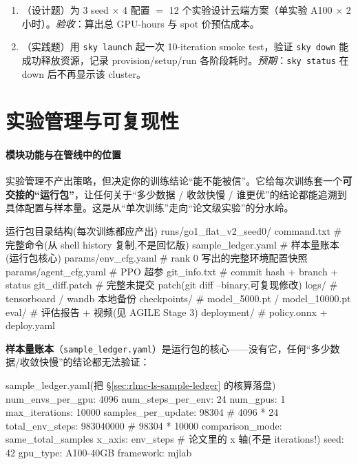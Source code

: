 \begin{practice}[云端训练练习]
\begin{enumerate}
\item （设计题）为 3 seed $\times$ 4 配置 $=$ 12 个实验设计云端方案（单实验 A100 $\times$ 2 小时）。\emph{验收}：算出总 GPU-hours 与 spot 价预估成本。
\item （实践题）用 \verb|sky launch| 起一次 10-iteration smoke test，验证 \verb|sky down| 能成功释放资源，记录 provision/setup/run 各阶段耗时。\emph{预期}：\verb|sky status| 在 down 后不再显示该 cluster。
\end{enumerate}
\end{practice}

\section{实验管理与可复现性}
\label{sec:rlmc-ls-repro}

\paragraph{\texorpdfstring{ 模块功能与在管线中的位置}{1 模块功能与在管线中的位置}}实验管理不产出策略，但决定你的训练结论“能不能被信”。它给每次训练套一个\textbf{可交接的“运行包”}，让任何关于“多少数据 / 收敛快慢 / 谁更优”的结论都能追溯到具体配置与样本量。这是从“单次训练”走向“论文级实验”的分水岭。

\begin{codebox}[text]{运行包目录结构(每次训练都应产出)}
runs/go1_flat_v2_seed0/
  command.txt           # 完整命令(从 shell history 复制,不是回忆版)
  sample_ledger.yaml    # 样本量账本(运行包核心)
  params/env_cfg.yaml   # rank 0 写出的完整环境配置快照
  params/agent_cfg.yaml # PPO 超参
  git_info.txt          # commit hash + branch + status
  git_diff.patch        # 完整未提交 patch(git diff --binary,可复现修改)
  logs/                 # tensorboard / wandb 本地备份
  checkpoints/          # model_5000.pt / model_10000.pt
  eval/                 # 评估报告 + 视频(见 AGILE Stage 3)
  deployment/           # policy.onnx + deploy.yaml
\end{codebox}

\textbf{样本量账本}（\verb|sample_ledger.yaml|）是运行包的核心——没有它，任何“多少数据/收敛快慢”的结论都无法验证：

\begin{codebox}[text]{sample\_ledger.yaml(把 §\ref{sec:rlmc-ls-sample-ledger} 的核算落盘)}
num_envs_per_gpu: 4096
num_steps_per_env: 24
num_gpus: 1
max_iterations: 10000
samples_per_update: 98304          # 4096 * 24
total_env_steps: 983040000         # 98304 * 10000
comparison_mode: same_total_samples
x_axis: env_steps                  # 论文里的 x 轴(不是 iterations!)
seed: 42
gpu_type: A100-40GB
framework: mjlab
\end{codebox}

